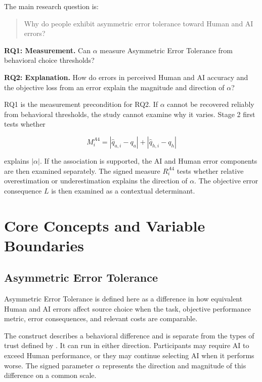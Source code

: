 \documentclass[11pt,a4paper]{article}
\newcommand{\condition}[1]{\textbf{#1}}
\begin{document}
The main research question is:

\begin{quote}
Why do people exhibit asymmetric error tolerance toward Human and AI errors?
\end{quote}

\condition{RQ1: Measurement.} Can $\alpha$ measure Asymmetric Error Tolerance from behavioral choice thresholds?

\condition{RQ2: Explanation.} How do errors in perceived Human and AI accuracy and the objective loss from an error explain the magnitude and direction of $\alpha$?

RQ1 is the measurement precondition for RQ2. If $\alpha$ cannot be recovered reliably from behavioral thresholds, the study cannot examine why it varies. Stage 2 first tests whether

\begin{equation*}
M_i^{A4}=|\widehat q_{a,i}-q_a|+|\widehat q_{h,i}-q_h|
\end{equation*}

explains $|\alpha|$. If the association is supported, the AI and Human error components are then examined separately. The signed measure $R_i^{A4}$ tests whether relative overestimation or underestimation explains the direction of $\alpha$. The objective error consequence $L$ is then examined as a contextual determinant.

\section{Core Concepts and Variable Boundaries}

\subsection{Asymmetric Error Tolerance}

Asymmetric Error Tolerance is defined here as a difference in how equivalent Human and AI errors affect source choice when the task, objective performance metric, error consequences, and relevant costs are comparable.

The construct describes a behavioral difference and is separate from the types of trust defined by \citet{everett2026}. It can run in either direction. Participants may require AI to exceed Human performance, or they may continue selecting AI when it performs worse. The signed parameter $\alpha$ represents the direction and magnitude of this difference on a common scale.
\end{document}
